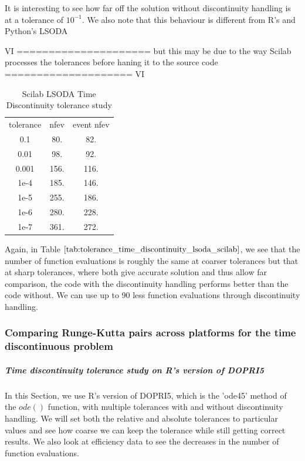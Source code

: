 It is interesting to see how far off the solution without discontinuity handling is at a tolerance of $10^{-1}$. We also note that this behaviour is different from R's and Python's LSODA 

VI ===================== 
but this may be due to the way Scilab processes the tolerances before haning it to the source code
==================== VI

\begin{table}[h]
\caption {Scilab LSODA Time Discontinuity tolerance study} 
    \label{tab:tolerance_time_discontinuity_lsoda_scilab} 
\begin{center}
\begin{tabular}{ c c c }
tolerance & nfev & event nfev \\ 
    0.1   & 80.  & 82.   \\
    0.01  & 98.  & 92.   \\
    0.001 & 156. & 116.  \\
    1e-4  & 185. & 146.  \\
    1e-5  & 255. & 186.  \\
    1e-6  & 280. & 228.  \\
    1e-7  & 361. & 272.  \\
\end{tabular}
\end{center}
\end{table}
Again, in Table $\ref{tab:tolerance_time_discontinuity_lsoda_scilab}$, we see that the number of function evaluations is roughly the same at coarser tolerances but that at sharp tolerances, where both give accurate solution and thus allow far comparison, the code with the discontinuity handling performs better than the code without. We can use up to 90 less function evaluations through discontinuity handling.  

\subsubsection{Comparing Runge-Kutta pairs across platforms for the time discontinuous problem}
\subparagraph{Time discontinuity tolerance study on R's version of DOPRI5}

In this Section, we use R's version of DOPRI5, which is the 'ode45' method of the $ode()$ function, with multiple tolerances with and without discontinuity handling. We will set both the relative and absolute tolerances to particular values and see how coarse we can keep the tolerance while still getting correct results. We also look at efficiency data to see the decreases in the number of function evaluations.

